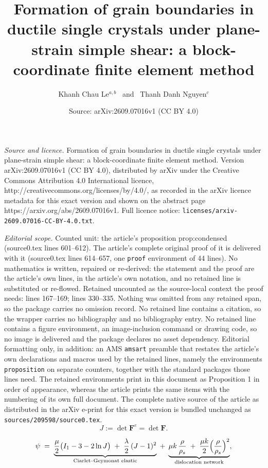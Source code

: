 \documentclass[10pt,a4paper]{amsart}
\title{Formation of grain boundaries in ductile single crystals under plane-strain simple shear: a block-coordinate finite element method}
\author{Khanh Chau Le$^{a,b}$ \ and \ Thanh Danh Nguyen$^{c}$}
\date{Source: arXiv:2609.07016v1 (CC BY 4.0)}
\newcommand{\Fe}{\bF^{e}}
\newcommand{\bF}{\bm{F}}
\begin{document}
\maketitle

\noindent\emph{Source and licence.} Formation of grain boundaries in ductile single crystals under plane-strain simple shear: a block-coordinate finite element method. Version arXiv:2609.07016v1 (CC BY 4.0), distributed by arXiv under the Creative Commons Attribution 4.0 International licence, http://creativecommons.org/licenses/by/4.0/, as recorded in the arXiv licence metadata for this exact version and shown on the abstract page https://arxiv.org/abs/2609.07016v1. Full licence notice: \texttt{licenses/arxiv-2609.07016-CC-BY-4.0.txt}.\par\smallskip

\noindent\textit{Editorial scope.} Counted unit: the article's proposition prop:condensed (source0.tex lines 601--612). The article's complete original proof of it is delivered with it (source0.tex lines 614--657, one \texttt{proof} environment of 44 lines). No mathematics is written, repaired or re-derived: the statement and the proof are the article's own lines, in the article's own notation, and no retained line is substituted or re-flowed.  Retained uncounted as the source-local context the proof needs: lines 167--169; lines 330--335.  Nothing was omitted from any retained span, so the package carries no omission record.  No retained line contains a citation, so the wrapper carries no bibliography and no bibliography entry.  No retained line contains a figure environment, an image-inclusion command or drawing code, so no image is delivered and the package declares no asset dependency.  Editorial formatting only, in addition: an AMS \texttt{amsart} preamble that restates the article's own declarations and macros used by the retained lines, namely the environments \texttt{proposition} on separate counters, together with the standard packages those lines need.  The retained environments print in this document as Proposition 1 in order of appearance, whereas the article prints the same items with the numbering of its own full document.  The complete native source of the article as distributed in the arXiv e-print for this exact version is bundled unchanged as \texttt{sources/209598/source0.tex}.
\begin{equation}\label{eq:J}
  J:=\det\Fe=\det\bF .
\end{equation}

\begin{equation}\label{eq:psi}
  \psi \;=\; \underbrace{\frac{\mu}{2}\bigl(I_1-3-2\ln J\bigr)
  \;+\; \frac{\lambda}{2}\,(J-1)^2}_{\text{Ciarlet--Geymonat elastic}}
  \;+\; \underbrace{\mu k\,\frac{\rho}{\rho_s}
  \;+\; \frac{\mu k}{2}\Bigl(\frac{\rho}{\rho_s}\Bigr)^{2}}_{\text{dislocation network}} ,
\end{equation}
\end{document}
